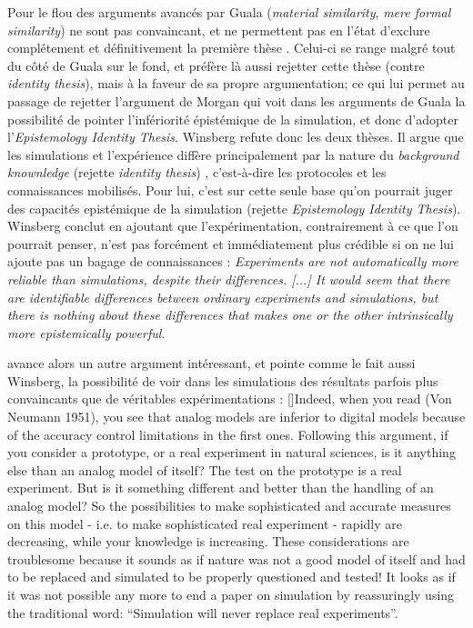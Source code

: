 Pour \textcite{Winsberg2009} le flou des arguments avancés par Guala  (\textit{material similarity}, \textit{mere formal similarity}) ne sont pas convaincant, et ne permettent pas en l'état d'exclure complétement et définitivement la première thèse . Celui-ci se range malgré tout du côté de Guala sur le fond, et préfère là aussi rejetter cette thèse (contre \textit{identity thesis}), mais à la faveur de sa propre argumentation; ce qui lui permet au passage de rejetter l'argument de Morgan qui voit dans les arguments de Guala la possibilité de pointer l'infériorité épistémique de la simulation, et donc d'adopter l'\textit{Epistemology Identity Thesis}. Winsberg refute donc les deux thèses. Il argue que les simulations et l'expérience diffère principalement par la nature du \textit{background knownledge} (rejette \textit{identity thesis}) , c'est-à-dire les protocoles et les connaissances mobilisés. Pour lui, c'est sur cette seule base qu'on pourrait juger des capacités epistémique de la simulation (rejette \textit{Epistemology Identity Thesis}). Winsberg conclut en ajoutant que l'expérimentation, contrairement à ce que l'on pourrait penser, n'est pas forcément et immédiatement plus crédible si on ne lui ajoute pas un bagage de connaissances : \textit{Experiments are not automatically more reliable than simulations, despite their differences. [...] It would seem that there are identifiable differences between ordinary experiments and simulations, but there is nothing about these differences that makes one or the other intrinsically more epistemically powerful.}  \autocites{Winsberg2009, Winsberg2013}

\textcite{Varenne2001} avance alors un autre argument intéressant, et pointe comme le fait aussi Winsberg, la possibilité de voir dans les simulations des résultats parfois plus convaincants que de véritables expérimentations : [\cite{Varenne2001}]{Indeed, when you read (Von Neumann 1951), you see that analog models are inferior to digital models because of the accuracy control limitations in the first ones. Following this argument, if you consider a prototype, or a real experiment in natural sciences, is it anything else than an analog model of itself? The test on the prototype is a real experiment. But is it something different and better than the handling of an analog model? So the possibilities to make sophisticated and accurate measures on this model - i.e. to make sophisticated real experiment - rapidly are decreasing, while your knowledge is increasing. These considerations are troublesome because it sounds as if nature was not a good model of itself and had to be replaced and simulated to be properly questioned and tested! It looks as if it was not possible any more to end a paper on simulation by reassuringly using the traditional word: \enquote{Simulation will never replace real experiments}. }

